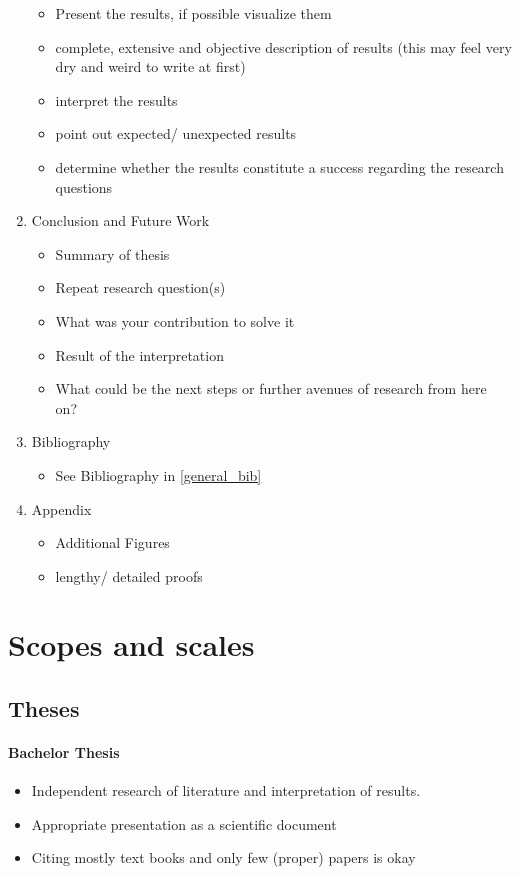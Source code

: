 \documentclass[logo, twocolumn]{mlai-report}
\begin{document}
\begin{enumerate}
\begin{itemize}
			\item Present the results, if possible visualize them
			\item complete, extensive and objective description of results (this may feel very dry and weird to write at first)
			\item interpret the results
			\item point out expected/ unexpected results
			\item determine whether the results constitute a success regarding the research questions
		\end{itemize}
	\item Conclusion and Future Work
		\begin{itemize}
			\item Summary of thesis
			\item Repeat research question(s)
			\item What was your contribution to solve it
			\item Result of the interpretation
			\item What could be the next steps or further avenues of research from here on?
		\end{itemize}
	\item Bibliography
		\begin{itemize}
			\item See Bibliography in \ref{general_bib}
		\end{itemize}
	\item Appendix
		\begin{itemize}
			\item Additional Figures
			\item lengthy/ detailed proofs
		\end{itemize}
\end{enumerate}

\section{Scopes and scales}

\subsection{Theses}

\paragraph{Bachelor Thesis} \label{Scope BA}
\begin{itemize}
	\item Independent research of literature and interpretation of results. 
	\item Appropriate presentation as a scientific document
	\item Citing mostly text books and only few (proper) papers is okay
\end{itemize}
\end{document}
